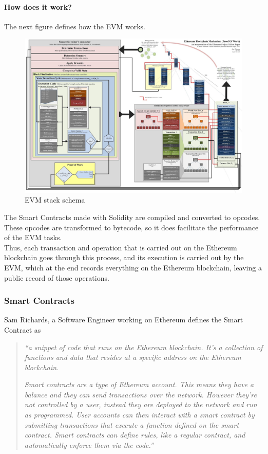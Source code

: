 \documentclass[a4paper, 12pt]{article} %
\begin{document}
            \paragraph{How does it work?}
                The next figure defines how the EVM works.
                \begin{figure}[h]
                    \centering
                    \includegraphics[width=1\textwidth]{evm-stack.jpeg}
                    \caption{EVM stack schema}
                    \label{fig:blockchain_stack}
                \end{figure}
                The Smart Contracts made with Solidity are compiled and converted to opcodes. These opcodes are transformed to bytecode, so it does facilitate the performance of the EVM tasks.\\

                Thus, each transaction and operation that is carried out on the Ethereum blockchain goes through this process, and its execution is carried out by the EVM, which at the end records everything on the Ethereum blockchain, leaving a public record of those operations. 

        \subsubsection{Smart Contracts}
            Sam Richards, a Software Engineer working on Ethereum defines the Smart Contract as 
            \begin{quote}
                \textit{“a snippet of code that runs on the Ethereum blockchain. It's a collection of functions and data that resides at a specific address on the Ethereum blockchain.}

                \textit{Smart contracts are a type of Ethereum account. This means they have a balance and they can send transactions over the network. However they're not controlled by a user, instead they are deployed to the network and run as programmed. User accounts can then interact with a smart contract by submitting transactions that execute a function defined on the smart contract. Smart contracts can define rules, like a regular contract, and automatically enforce them via the code.”}
            \end{quote}
\end{document}
